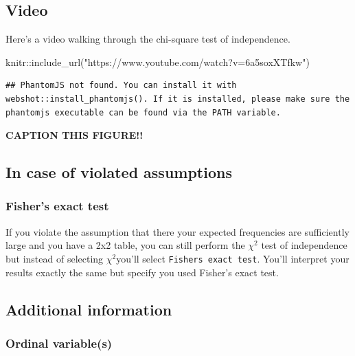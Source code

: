 \documentclass[
]{book}
\newenvironment{Shaded}{\begin{snugshade}}{\end{snugshade}}
\newcommand{\FunctionTok}[1]{\textcolor[rgb]{0.00,0.00,0.00}{#1}}
\newcommand{\NormalTok}[1]{#1}
\newcommand{\SpecialCharTok}[1]{\textcolor[rgb]{0.00,0.00,0.00}{#1}}
\newcommand{\StringTok}[1]{\textcolor[rgb]{0.31,0.60,0.02}{#1}}
\begin{document}
\hypertarget{video-5}{%
\subsection{Video}\label{video-5}}

Here's a video walking through the chi-square test of independence.

\begin{Shaded}
\begin{Highlighting}[]
\NormalTok{knitr}\SpecialCharTok{::}\FunctionTok{include\_url}\NormalTok{(}\StringTok{"https://www.youtube.com/watch?v=6a5soxXTfkw"}\NormalTok{)}
\end{Highlighting}
\end{Shaded}

\begin{verbatim}
## PhantomJS not found. You can install it with webshot::install_phantomjs(). If it is installed, please make sure the phantomjs executable can be found via the PATH variable.
\end{verbatim}

\label{fig:unnamed-chunk-1}\textbf{CAPTION THIS FIGURE!!}

\hypertarget{in-case-of-violated-assumptions-3}{%
\subsection{In case of violated assumptions}\label{in-case-of-violated-assumptions-3}}

\hypertarget{fishers-exact-test}{%
\subsubsection{Fisher's exact test}\label{fishers-exact-test}}

If you violate the assumption that there your expected frequencies are sufficiently large and you have a 2x2 table, you can still perform the \(\chi^2\) test of independence but instead of selecting \(\chi^2\)you'll select \texttt{Fisher\textquotesingle{}s\ exact\ test}. You'll interpret your results exactly the same but specify you used Fisher's exact test.

\hypertarget{additional-information-2}{%
\subsection{Additional information}\label{additional-information-2}}

\hypertarget{ordinal-variables}{%
\subsubsection{Ordinal variable(s)}\label{ordinal-variables}}
\end{document}
